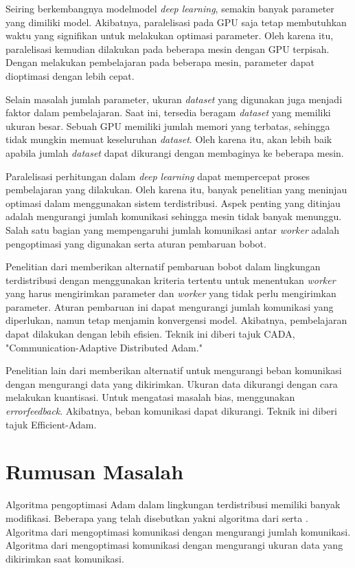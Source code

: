 Seiring berkembangnya model\+model \emph{deep learning}, semakin banyak parameter yang dimiliki model. Akibatnya, paralelisasi pada GPU saja tetap membutuhkan waktu yang signifikan untuk melakukan optimasi parameter. Oleh karena itu, paralelisasi kemudian dilakukan pada beberapa mesin dengan GPU terpisah. Dengan melakukan pembelajaran pada beberapa mesin, parameter dapat dioptimasi dengan lebih cepat.

Selain masalah jumlah parameter, ukuran \emph{dataset} yang digunakan juga menjadi faktor dalam pembelajaran. Saat ini, tersedia beragam \emph{dataset} yang memiliki ukuran besar. Sebuah GPU memiliki jumlah memori yang terbatas, sehingga tidak mungkin memuat keseluruhan \emph{dataset}. Oleh karena itu, akan lebih baik apabila jumlah \emph{dataset} dapat dikurangi dengan membaginya ke beberapa mesin.

Paralelisasi perhitungan dalam \emph{deep learning} dapat mempercepat proses pembelajaran yang dilakukan. Oleh karena itu, banyak penelitian yang meninjau optimasi dalam menggunakan sistem terdistribusi. Aspek penting yang ditinjau adalah mengurangi jumlah komunikasi sehingga mesin tidak banyak menunggu. Salah satu bagian yang mempengaruhi jumlah komunikasi antar \emph{worker} adalah pengoptimasi yang digunakan serta aturan pembaruan bobot.

Penelitian dari \textcite{Chen2021CADA} memberikan alternatif pembaruan bobot dalam lingkungan terdistribusi dengan menggunakan kriteria tertentu untuk menentukan \emph{worker} yang harus mengirimkan parameter dan \emph{worker} yang tidak perlu mengirimkan parameter. Aturan pembaruan ini dapat mengurangi jumlah komunikasi yang diperlukan, namun tetap menjamin konvergensi model. Akibatnya, pembelajaran dapat dilakukan dengan lebih efisien. Teknik ini diberi tajuk CADA, "Communication-Adaptive Distributed Adam."

Penelitian lain dari \textcite{Chen2022Efficient} memberikan alternatif untuk mengurangi beban komunikasi dengan mengurangi data yang dikirimkan. Ukuran data dikurangi dengan cara melakukan kuantisasi. Untuk mengatasi masalah bias, \textcite{Chen2022Efficient} menggunakan \emph{error\+feedback}. Akibatnya, beban komunikasi dapat dikurangi. Teknik ini diberi tajuk Efficient-Adam.

\section{Rumusan Masalah}
Algoritma pengoptimasi Adam dalam lingkungan terdistribusi memiliki banyak modifikasi. Beberapa yang telah disebutkan yakni algoritma dari \textcite{Chen2021CADA} serta \textcite{Chen2022Efficient}. Algoritma dari \textcite{Chen2021CADA} mengoptimasi komunikasi dengan mengurangi jumlah komunikasi. Algoritma dari \textcite{Chen2022Efficient} mengoptimasi komunikasi dengan mengurangi ukuran data yang dikirimkan saat komunikasi.

